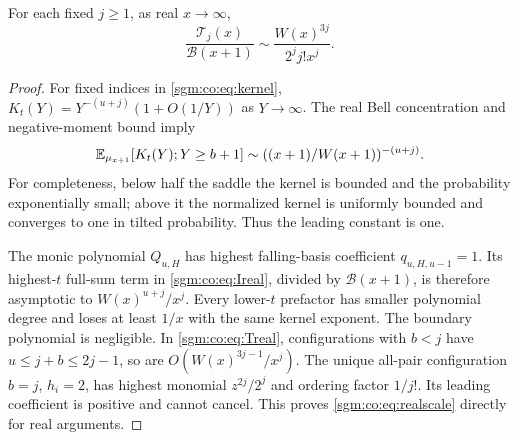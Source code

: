\documentclass[11pt,letterpaper]{article}
\theoremstyle{remark}\newtheorem{remark}[theorem]{Remark}
\theoremstyle{definition}\newtheorem{definition}[theorem]{Definition}
\begin{document}
\begin{proposition}\label{sgm:co:prop:realscales}
For each fixed $j\ge1$, as real $x\to\infty$,
\begin{equation}\label{sgm:co:eq:realscale}
 \frac{\mathcal T_j(x)}{\mathcal B(x+1)}
 \sim\frac{W(x)^{3j}}{2^j j!x^j}.
\end{equation}
\end{proposition}
\begin{proof}
For fixed indices in \eqref{sgm:co:eq:kernel},
$K_t(Y)=Y^{-(u+j)}(1+O(1/Y))$ as $Y\to\infty$. The real Bell concentration and negative-moment bound imply
\[
 \mathbb E_{\mu_{x+1}}[K_t(Y);Y\ge b+1]\sim
       ((x+1)/W(x+1))^{-(u+j)}.
\]
For completeness, below half the saddle the kernel is bounded and the probability exponentially small; above it the normalized kernel is uniformly bounded and converges to one in tilted probability. Thus the leading constant is one.

The monic polynomial $Q_{u,H}$ has highest falling-basis coefficient $q_{u,H,u-1}=1$. Its highest-$t$ full-sum term in \eqref{sgm:co:eq:Ireal}, divided by $\mathcal B(x+1)$, is therefore asymptotic to $W(x)^{u+j}/x^j$. Every lower-$t$ prefactor has smaller polynomial degree and loses at least $1/x$ with the same kernel exponent. The boundary polynomial is negligible. In \eqref{sgm:co:eq:Treal}, configurations with $b<j$ have $u\le j+b\le2j-1$, so are $O(W(x)^{3j-1}/x^j)$. The unique all-pair configuration $b=j$, $h_i=2$, has highest monomial $z^{2j}/2^j$ and ordering factor $1/j!$. Its leading coefficient is positive and cannot cancel. This proves \eqref{sgm:co:eq:realscale} directly for real arguments.
\end{proof}
\end{document}
